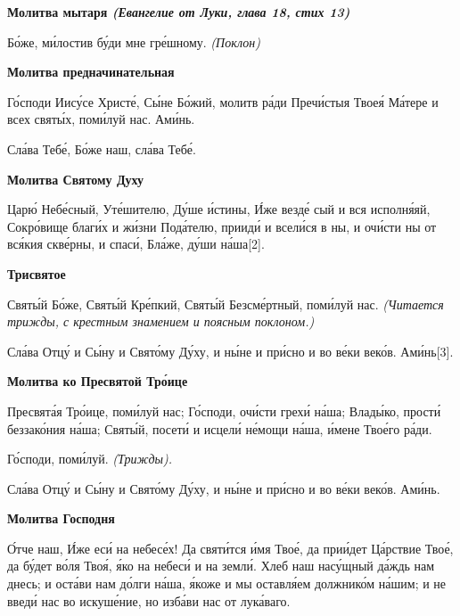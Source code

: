  

\bfseries Молитва мытаря \itshape (Евангелие от Луки, глава 18, стих 13)\normalfont{}\normalfont{}


   Бо́же, ми́лостив бу́ди мне гре́шному. \itshape (Поклон)\normalfont{}



 

\bfseries Молитва предначинательная\normalfont{}


   Го́споди Иису́се Христе́, Сы́не Бо́жий, молитв ра́ди Пречи́стыя Твоея́
Ма́тере и всех святы́х, поми́луй нас. Ами́нь.


   Сла́ва Тебе́, Бо́же наш, сла́ва Тебе́.



 

\bfseries Молитва Святому Духу\normalfont{}


   Царю́ Небе́сный, Уте́шителю, Ду́ше и́стины, И́же везде́ сый и
вся исполня́яй, Сокро́вище благи́х и жи́зни Пода́телю, прииди́ и
всели́ся в ны, и очи́сти ны от вся́кия скве́рны, и спаси́, Бла́же, ду́ши
на́ша[2].



 

\bfseries Трисвятое\normalfont{}


   Святы́й Бо́же, Святы́й Кре́пкий, Святы́й Безсме́ртный, поми́луй нас.
\itshape (Читается трижды, с крестным знамением и поясным поклоном.)\normalfont{}


   Сла́ва Отцу́ и Сы́ну и Свято́му Ду́ху, и ны́не и при́сно и во ве́ки веко́в.
Ами́нь[3].



 

\bfseries Молитва ко Пресвятой Тро́ице\normalfont{}


   Пресвята́я Тро́ице, поми́луй нас; Го́споди, очи́сти грехи́ на́ша; Влады́ко,
прости́ беззако́ния на́ша; Святы́й, посети́ и исцели́ не́мощи на́ша, и́мене
Твое́го ра́ди.


   Го́споди, поми́луй. \itshape (Трижды)\normalfont{}.


   Сла́ва Отцу́ и Сы́ну и Свято́му Ду́ху, и ны́не и при́сно и во ве́ки веко́в.
Ами́нь.



 

\bfseries Молитва Господня\normalfont{}


   О́тче наш, И́же еси́ на небесе́х! Да святи́тся и́мя Твое́, да прии́дет
Ца́рствие Твое́, да бу́дет во́ля Твоя́, я́ко на небеси́ и на земли́. Хлеб наш
насу́щный да́ждь нам днесь; и оста́ви нам до́лги на́ша, я́коже и мы оставля́ем
должнико́м на́шим; и не введи́ нас во искуше́ние, но изба́ви нас от
лука́ваго.



